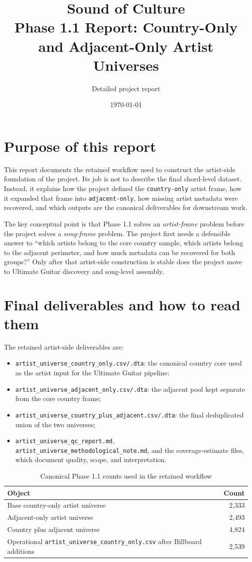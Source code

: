 \documentclass[11pt]{article}
\title{Sound of Culture\\Phase 1.1 Report: Country-Only and Adjacent-Only Artist Universes}
\author{Detailed project report}
\date{\today}
\begin{document}
\maketitle
\tableofcontents
\clearpage

\section{Purpose of this report}
This report documents the retained workflow used to construct the artist-side
foundation of the project. Its job is not to describe the final chord-level
dataset. Instead, it explains how the project defined the \texttt{country-only}
artist frame, how it expanded that frame into \texttt{adjacent-only}, how
missing artist metadata were recovered, and which outputs are the canonical
deliverables for downstream work.

The key conceptual point is that Phase 1.1 solves an \emph{artist-frame}
problem before the project solves a \emph{song-frame} problem. The project
first needs a defensible answer to ``which artists belong to the core country
sample, which artists belong to the adjacent perimeter, and how much metadata
can be recovered for both groups?'' Only after that artist-side construction is
stable does the project move to Ultimate Guitar discovery and song-level
assembly.

\section{Final deliverables and how to read them}
The retained artist-side deliverables are:
\begin{itemize}[leftmargin=2em]
\item \texttt{artist\_universe\_country\_only.csv/.dta}: the canonical country
core used as the artist input for the Ultimate Guitar pipeline;
\item \texttt{artist\_universe\_adjacent\_only.csv/.dta}: the adjacent pool kept
separate from the core country frame;
\item \texttt{artist\_universe\_country\_plus\_adjacent.csv/.dta}: the final
deduplicated union of the two universes;
\item \texttt{artist\_universe\_qc\_report.md},
\texttt{artist\_universe\_methodological\_note.md}, and the coverage-estimate
files, which document quality, scope, and interpretation.
\end{itemize}

\begin{table}[H]
\centering
\caption{Canonical Phase 1.1 counts used in the retained workflow}
\begin{tabularx}{\textwidth}{Y r}
\toprule
Object & Count \\
\midrule
Base country-only artist universe & 2,333 \\
Adjacent-only artist universe & 2,493 \\
Country plus adjacent universe & 4,824 \\
Operational \texttt{artist\_universe\_country\_only.csv} after Billboard additions & 2,539 \\
\bottomrule
\end{tabularx}
\end{table}
\end{document}
